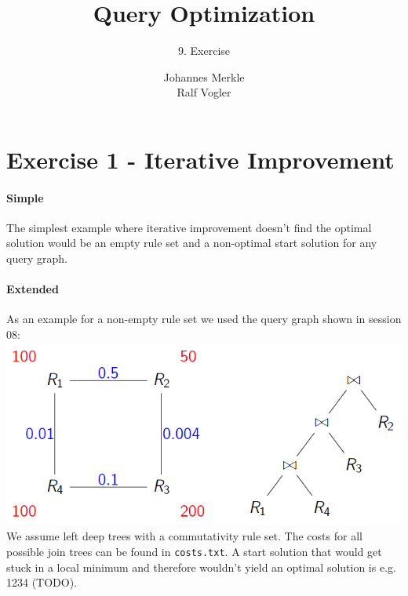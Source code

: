 \documentclass[11pt,a4paper]{scrartcl}
\begin{document}
\author{Johannes Merkle\\Ralf Vogler}
\title{Query Optimization}
\subtitle{9. Exercise}

\maketitle

\section*{Exercise 1 - Iterative Improvement}
\paragraph*{Simple}
The simplest example where iterative improvement doesn't find the optimal solution would be an empty rule set and a non-optimal start solution for any query graph.

\paragraph*{Extended}
As an example for a non-empty rule set we used the query graph shown in session 08:\\
\includegraphics[scale=.8]{graph-and-tree}\\
We assume left deep trees with a commutativity rule set.
The costs for all possible join trees can be found in \verb|costs.txt|.
A start solution that would get stuck in a local minimum and therefore wouldn't yield an optimal solution is e.g. 1234 (TODO).
\end{document}
